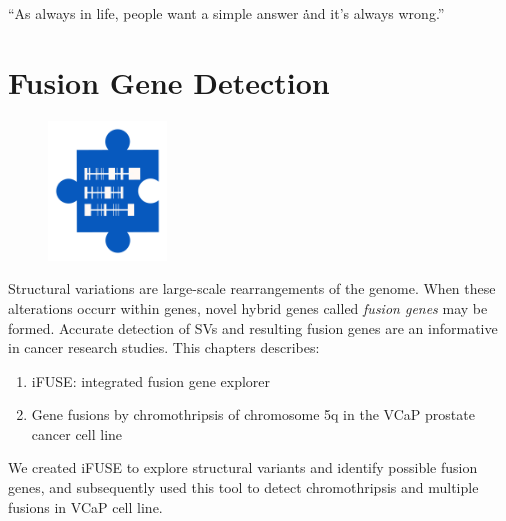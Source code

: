 \begin{savequote}[75mm]
“As always in life, people want a simple answer \. \. \. and it’s always wrong.”
\end{savequote}

\chapter{Fusion Gene Detection}\label{chapter:fusiongenes}
\setcounter{figure}{-1}
\setcounter{table}{-1}
\setcounter{section}{-1}

\begin{figure}[t!]
\includegraphics[height=10em]{frontmatter/images/chapter-header-3.png}
\end{figure}
\setcounter{figure}{-1}
\setcounter{table}{-1}
\setcounter{section}{-1}

Structural variations are large-scale rearrangements of the genome. When these alterations occurr within genes, novel hybrid genes called \emph{fusion genes} may be formed. Accurate detection of SVs and resulting fusion genes are an informative in cancer research studies. This chapters describes:

\begin{enumerate}
\itemsep-0.5em
\item iFUSE: integrated fusion gene explorer
\item Gene fusions by chromothripsis of chromosome 5q in the VCaP prostate cancer cell line
\end{enumerate}

We created iFUSE to explore structural variants and identify possible fusion genes, and subsequently used this tool to detect chromothripsis and multiple fusions in VCaP cell line.

